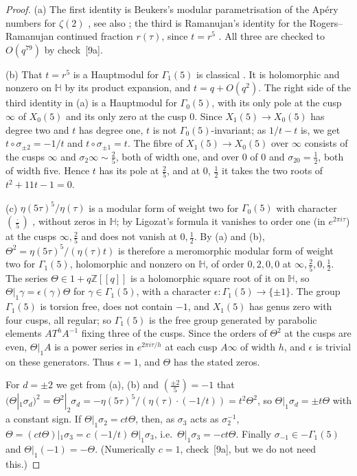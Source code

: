 \documentclass[11pt,a4paper]{article}
\theoremstyle{definition}\newtheorem{definition}[theorem]{Definition}
\theoremstyle{remark}\newtheorem{remark}[theorem]{Remark}
\newcommand{\Z}{\mathbb Z}
\newcommand{\Hb}{\mathbb H}
\numberwithin{equation}{section}
\begin{document}
\begin{proof}
(a) The first identity is Beukers's modular parametrisation of the Ap\'ery numbers for $\zeta(2)$ \cite{Beu87}, see also
\cite[case D]{Za09}; the third is Ramanujan's identity for the Rogers--Ramanujan continued fraction $r(\tau)$, since
$t=r^5$ \cite{Du05,Co17}. All three are checked to $O(q^{79})$ by check~[9a].

(b) That $t=r^5$ is a Hauptmodul for $\Gamma_1(5)$ is classical \cite{Du05}. It is holomorphic and nonzero on $\Hb$ by
its product expansion, and $t=q+O(q^2)$. The right side of the third identity in (a) is a Hauptmodul for $\Gamma_0(5)$,
with its only pole at the cusp $\infty$ of $X_0(5)$ and its only zero at the cusp $0$. Since
$X_1(5)\to X_0(5)$ has degree two and $t$ has degree one, $t$ is not $\Gamma_0(5)$-invariant; as $1/t-t$ is, we get
$t\circ\sigma_{\pm2}=-1/t$ and $t\circ\sigma_{\pm1}=t$. The fibre of $X_1(5)\to X_0(5)$ over $\infty$ consists of the
cusps $\infty$ and $\sigma_2\infty\sim\frac25$, both of width one, and over $0$ of $0$ and $\sigma_20=\frac12$, both of
width five. Hence $t$ has its pole at $\frac25$, and at $0$, $\frac12$ it takes the two roots of $t^2+11t-1=0$.

(c) $\eta(5\tau)^5/\eta(\tau)$ is a modular form of weight two for $\Gamma_0(5)$ with character $(\frac{\cdot}5)$
\cite[Thm.~1.64]{Ono04}, without zeros in $\Hb$; by Ligozat's formula \cite[Thm.~1.65]{Ono04} it vanishes to order one
(in $e^{2\pi i\tau}$) at the cusps $\infty,\frac25$ and does not vanish at $0,\frac12$. By (a) and (b),
$\Theta^2=\eta(5\tau)^5/(\eta(\tau)t)$ is therefore a meromorphic modular form of weight two for $\Gamma_1(5)$, holomorphic
and nonzero on $\Hb$, of order $0,2,0,0$ at $\infty,\frac25,0,\frac12$. The series $\Theta\in1+q\Z[[q]]$ is a holomorphic
square root of it on $\Hb$, so $\Theta|_1\gamma=\epsilon(\gamma)\Theta$ for $\gamma\in\Gamma_1(5)$, with a character
$\epsilon:\Gamma_1(5)\to\{\pm1\}$. The group $\Gamma_1(5)$ is torsion free, does not contain $-1$, and $X_1(5)$ has genus
zero with four cusps, all regular; so $\Gamma_1(5)$ is the free group generated by parabolic elements $A T^{h}A^{-1}$
fixing three of the cusps. Since the orders of $\Theta^2$ at the cusps are even, $\Theta|_1A$ is a power series in
$e^{2\pi i\tau/h}$ at each cusp $A\infty$ of width $h$, and $\epsilon$ is trivial on these generators. Thus $\epsilon=1$,
and $\Theta$ has the stated zeros.

For $d=\pm2$ we get from (a), (b) and $(\frac{\pm2}5)=-1$ that
$(\Theta|_1\sigma_d)^2=\Theta^2|_2\sigma_d=-\eta(5\tau)^5/(\eta(\tau)\cdot(-1/t))=t^2\Theta^2$, so
$\Theta|_1\sigma_d=\pm t\Theta$ with a constant sign. If $\Theta|_1\sigma_2=ct\Theta$, then, as $\sigma_3$ acts as
$\sigma_2^{-1}$, $\Theta=(ct\Theta)|_1\sigma_3=c\,(-1/t)\,\Theta|_1\sigma_3$, i.e.\ $\Theta|_1\sigma_3=-ct\Theta$. Finally
$\sigma_{-1}\in-\Gamma_1(5)$ and $\Theta|_1(-1)=-\Theta$. (Numerically $c=1$, check~[9a], but we do not need this.)
\end{proof}
\end{document}
